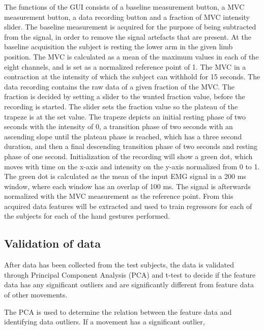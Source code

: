 The functions of the GUI consists of a baseline measurement button, a MVC measurement button, a data recording button and a fraction of MVC intensity slider. The baseline measurement is acquired for the purpose of being subtracted from the signal, in order to remove the signal artefacts that are present. At the baseline acquisition the subject is resting the lower arm in the given limb position. The MVC is calculated as a mean of the maximum values in each of the eight channels, and is set as a normalized reference point of 1. The MVC in a contraction at the intensity of which the subject can withhold for 15 seconds. The data recording contains the raw data of a given fraction of the MVC. The fraction is decided by setting a slider to the wanted fraction value, before the recording is started. The slider sets the fraction value so the plateau of the trapeze is at the set value. The trapeze depicts an initial resting phase of two seconds with the intensity of 0, a transition phase of two seconds with an ascending slope until the plateau phase is reached, which has a three second duration, and then a final descending transition phase of two seconds and resting phase of one second. Initialization of the recording will show a green dot, which moves with time on the x-axis and intensity on the y-axis normalized from 0 to 1. The green dot is calculated as the mean of the input EMG signal in a 200 ms window, where each window has an overlap of 100 ms. The signal is afterwards normalized with the MVC measurement as the reference point. From this acquired data features will be extracted and used to train regressors for each of the subjects for each of the hand gestures performed.


\subsection{Validation of data}


After data has been collected from the test subjects, the data is validated through Principal Component Analysis (PCA) and t-test to decide if the feature data has any significant outliers and are significantly different from feature data of other movements. 

The PCA is used to determine the relation between the feature data and identifying data outliers. If a movement has a significant outlier, 



